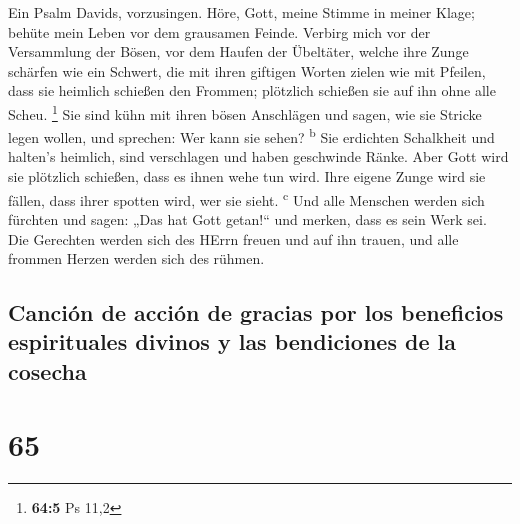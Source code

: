  Ein Psalm Davids, vorzusingen.  Höre, Gott,
meine Stimme in meiner Klage; behüte mein Leben vor dem grausamen
Feinde.  Verbirg mich vor der Versammlung der Bösen, vor
dem Haufen der Übeltäter,  welche ihre Zunge schärfen wie
ein Schwert, die mit ihren giftigen Worten zielen wie mit Pfeilen,
 dass sie heimlich schießen den Frommen; plötzlich
schießen sie auf ihn ohne alle Scheu. \footnote{\textbf{64:5} Ps 11,2}
 Sie sind kühn mit ihren bösen Anschlägen und sagen, wie
sie Stricke legen wollen, und sprechen: Wer kann sie sehen?
\textsuperscript{b}  Sie erdichten Schalkheit und halten's
heimlich, sind verschlagen und haben geschwinde Ränke. 
Aber Gott wird sie plötzlich schießen, dass es ihnen wehe tun wird.
 Ihre eigene Zunge wird sie fällen, dass ihrer spotten
wird, wer sie sieht. \textsuperscript{c}  Und alle
Menschen werden sich fürchten und sagen: „Das hat Gott getan!{}`` und
merken, dass es sein Werk sei.  Die Gerechten werden sich
des HErrn freuen und auf ihn trauen, und alle frommen Herzen werden sich
des rühmen.

\hypertarget{canciuxf3n-de-acciuxf3n-de-gracias-por-los-beneficios-espirituales-divinos-y-las-bendiciones-de-la-cosecha}{%
\subsection{Canción de acción de gracias por los beneficios espirituales
divinos y las bendiciones de la
cosecha}\label{canciuxf3n-de-acciuxf3n-de-gracias-por-los-beneficios-espirituales-divinos-y-las-bendiciones-de-la-cosecha}}

\hypertarget{section-64}{%
\section{65}\label{section-64}}

